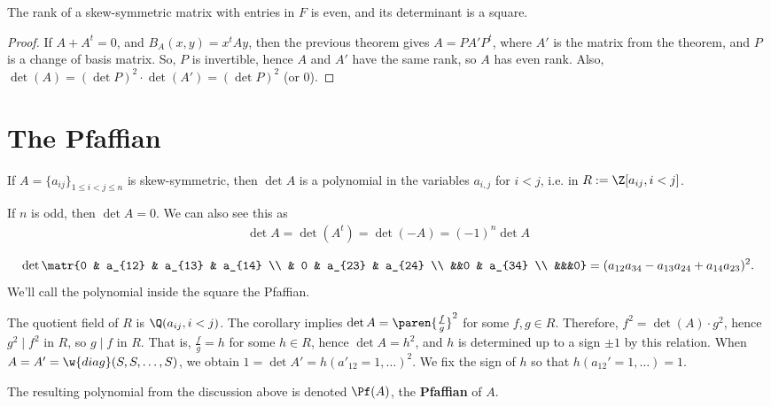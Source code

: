 \begin{cor}
    The rank of a skew-symmetric matrix with entries in $F$ is even, and its determinant is a square.
\end{cor}

\begin{proof}
    If $A + A^t=0$, and $B_A(x,y)=x^tAy$, then the previous theorem gives $A=PA'P^t$, where $A'$ is the matrix from the theorem, and $P$ is a change of basis matrix. So, $P$ is invertible, hence $A$ and $A'$ have the same rank, so $A$ has even rank. Also, $\det (A) = (\det P)^2 \cdot \det (A')=(\det P)^2$ (or $0$).
\end{proof}

\section{The Pfaffian}

If $A = \{ a_{ij}\}_{1 \leq i < j \leq n}$ is skew-symmetric, then $\det A$ is a polynomial in the variables $a_{i,j}$ for $i<j$, i.e. in $R:= \Z[a_{ij},i<j]$.

\begin{ex}
    If $n$ is odd, then $\det A=0$. We can also see this as
    \begin{align*}
        \det A = \det (A^t) = \det (-A) = (-1)^n\det A
    \end{align*}
\end{ex}

\begin{ex}
    $$\det\matr{0 & a_{12} & a_{13} & a_{14} \\ & 0 & a_{23} & a_{24} \\ &&0  & a_{34} \\ &&&0}=(a_{12}a_{34}-a_{13}a_{24}+a_{14}a_{23})^2.$$
    We'll call the polynomial inside the square the Pfaffian.
\end{ex}

The quotient field of $R$ is $\Q (a_{ij},i<j)$. The corollary implies $\det A = \paren{\frac{f}{g}}^2$ for some $f,g \in R$. Therefore, $f^2 = \det (A) \cdot g^2$, hence $g^2 \mid f^2$ in $R$, so $g \mid f$ in $R$. That is, $\frac{f}{g}=h$ for some $h \in R$, hence $\det A = h^2$, and $h$ is determined up to a sign $\pm 1$ by this relation. When $A=A'=\w{diag}(S,S,\dots,S)$, we obtain $1= \det A'= h(a'_{12}=1,\dots)^2$. We fix the sign of $h$ so that $h(a_{12}'=1,\dots)=1$.

\begin{defn}
    The resulting polynomial from the discussion above is denoted $\Pf (A)$, the \textbf{Pfaffian} of $A$.
\end{defn}

